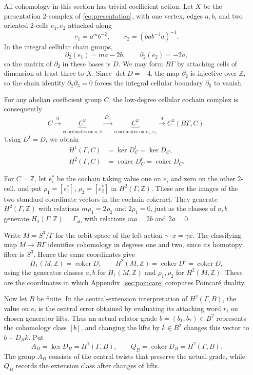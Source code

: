 \documentclass[11pt,a4paper,reqno]{amsart}
\theoremstyle{plain}
\theoremstyle{definition}
\theoremstyle{remark}
\numberwithin{equation}{section}
\newcommand{\ZZ}{\mathbb Z}
\DeclareMathOperator{\coker}{coker}
\begin{document}
All cohomology in this section has trivial coefficient action. Let $X$ be the presentation $2$-complex of \eqref{eq:presentation}, with one vertex, edges $a,b$, and two oriented $2$-cells $e_1,e_2$ attached along
\[
r_1=a^mb^{-2},\qquad r_2=(bab^{-1}a)^{-1}.
\]
In the integral cellular chain groups,
\[
\partial_2(e_1)=ma-2b,\qquad \partial_2(e_2)=-2a,
\]
so the matrix of $\partial_2$ in these bases is $D$. We may form $B\Gamma$ by attaching cells of dimension at least three to $X$. Since $\det D=-4$, the map $\partial_2$ is injective over $\ZZ$, so the chain identity $\partial_2\partial_3=0$ forces the integral cellular boundary $\partial_3$ to vanish.

For any abelian coefficient group $C$, the low-degree cellular cochain complex is consequently
\[
C\xrightarrow{\ 0\ } \underbrace{C^2}_{\text{coordinates on }a,b} \xrightarrow{\ D_C^t\ } \underbrace{C^2}_{\text{coordinates on }e_1,e_2} \xrightarrow{\ 0\ }C^3(B\Gamma,C).
\]
Using $D^t=D$, we obtain
\begin{equation}\label{eq:cohomology}
\begin{aligned}
H^1(\Gamma,C)&=\ker D_C^t=\ker D_C,\\
H^2(\Gamma,C)&=\coker D_C^t=\coker D_C.
\end{aligned}
\end{equation}

For $C=\ZZ$, let $e_i^*$ be the cochain taking value one on $e_i$ and zero on the other $2$-cell, and put $\rho_1=[e_1^*]$, $\rho_2=[e_2^*]$ in $H^2(\Gamma,\ZZ)$. These are the images of the two standard coordinate vectors in the cochain cokernel. They generate $H^2(\Gamma,\ZZ)$ with relations $m\rho_1=2\rho_2$ and $2\rho_1=0$, just as the classes of $a,b$ generate $H_1(\Gamma,\ZZ)=\Gamma_{\mathrm{ab}}$ with relations $ma=2b$ and $2a=0$.

Write $M=S^3/\Gamma$ for the orbit space of the left action $\gamma\cdot x=\gamma x$. The classifying map $M\to B\Gamma$ identifies cohomology in degrees one and two, since its homotopy fiber is $S^3$. Hence the same coordinates give
\[
H_1(M,\ZZ)=\coker D,\qquad H^2(M,\ZZ)=\coker D^t=\coker D,
\]
using the generator classes $a,b$ for $H_1(M,\ZZ)$ and $\rho_1,\rho_2$ for $H^2(M,\ZZ)$. These are the coordinates in which Appendix~\ref{sec:poincare} computes Poincar\'e duality.

Now let $B$ be finite. In the central-extension interpretation of $H^2(\Gamma,B)$, the value on $e_i$ is the central error obtained by evaluating its attaching word $r_i$ on chosen generator lifts. Thus an actual relator grade $b=(b_1,b_2)\in B^2$ represents the cohomology class $[b]$, and changing the lifts by $k\in B^2$ changes this vector to $b+D_Bk$. Put
\[
A_B=\ker D_B=H^1(\Gamma,B),\qquad Q_B=\coker D_B=H^2(\Gamma,B).
\]
The group $A_B$ consists of the central twists that preserve the actual grade, while $Q_B$ records the extension class after changes of lifts.
\end{document}
